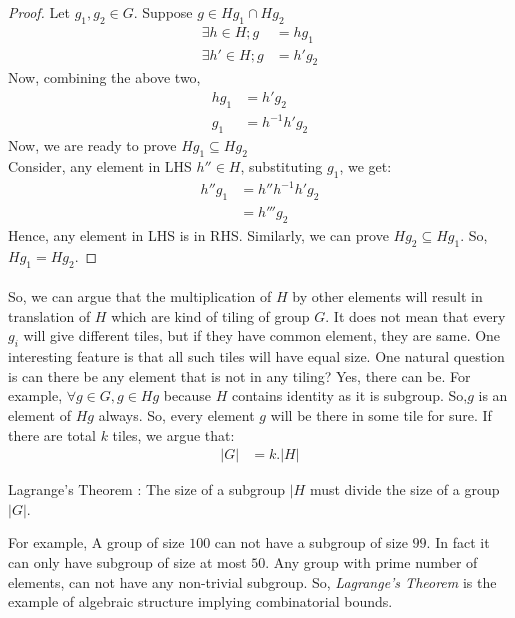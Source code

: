 \begin{proof}
Let $g_1,g_2\in G$. Suppose $g\in Hg_1\cap Hg_2$
\begin{align*}
\exists h\in H; g&=hg_1\\
\exists h'\in H; g&=h'g_2
\end{align*}
Now, combining the above two,
\begin{align*}
hg_1&=h'g_2\\
g_1&=h^{-1}h'g_2
\end{align*}
Now, we are ready to prove $Hg_1\subseteq Hg_2$\\
Consider, any element in LHS $h''\in H $, substituting $g_1$, we get:
\begin{align*}
h''g_1&=h''h^{-1}h'g_2\\
&=h'''g_2
\end{align*}
Hence, any element in LHS is in RHS. Similarly, we can prove $Hg_2\subseteq Hg_1$. So, $Hg_1=Hg_2$.
\end{proof}
\paragraph{}
So, we can argue that the multiplication of $H$ by other elements will result in translation of $H$ which are kind of tiling of group $G$. It does not mean that every $g_i$ will give different tiles, but if they have common element, they are same. One interesting feature is that all such tiles will have equal size. One natural question is can there be any element that is not in any tiling? Yes, there can be. For example, $\forall g\in G, g\in Hg$ because $H$ contains identity as it is subgroup. So,$g$ is an element of $Hg$ always. So, every element $g$ will be there in some tile for sure. If there are total $k$ tiles, we argue that:
\begin{align*}
|G|&=k.|H|
\end{align*}
\begin{theorem}
Lagrange's Theorem : The size of a subgroup $|H$ must divide the size of a group $|G|$.
\end{theorem}
 For example, A group of size $100$ can not have a subgroup of size $99$. In fact it can only have subgroup of size at most $50$. Any group with prime number of elements, can not have any non-trivial subgroup. So, \emph{Lagrange's Theorem} is the example of algebraic structure implying combinatorial bounds.


